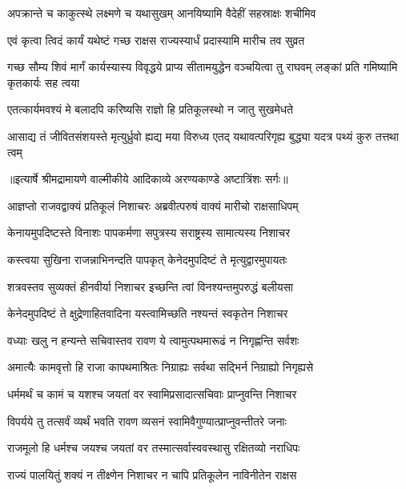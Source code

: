\twolineshloka
{अपक्रान्ते च काकुत्स्थे लक्ष्मणे च यथासुखम्}
{आनयिष्यामि वैदेहीं सहस्राक्षः शचीमिव} %

\twolineshloka
{एवं कृत्वा त्विदं कार्यं यथेष्टं गच्छ राक्षस}
{राज्यस्यार्धं प्रदास्यामि मारीच तव सुव्रत} %

\threelineshloka
{गच्छ सौम्य शिवं मार्गं कार्यस्यास्य विवृद्धये}
{प्राप्य सीतामयुद्धेन वञ्चयित्वा तु राघवम्}
{लङ्कां प्रति गमिष्यामि कृतकार्यः सह त्वया} %

\twolineshloka
{एतत्कार्यमवश्यं मे बलादपि करिष्यसि}
{राज्ञो हि प्रतिकूलस्थो न जातु सुखमेधते} %

\fourlineindentedshloka
{आसाद्य तं जीवितसंशयस्ते}
{मृत्युर्ध्रुवो ह्यद्य मया विरुध्य}
{एतद् यथावत्परिगृह्य बुद्ध्या}
{यदत्र पथ्यं कुरु तत्तथा त्वम्} %


{॥इत्यार्षे श्रीमद्रामायणे वाल्मीकीये आदिकाव्ये अरण्यकाण्डे अष्टात्रिंशः सर्गः॥}


\twolineshloka
{आज्ञप्तो राजवद्वाक्यं प्रतिकूलं निशाचरः}
{अब्रवीत्परुषं वाक्यं मारीचो राक्षसाधिपम्} %

\twolineshloka
{केनायमुपदिष्टस्ते विनाशः पापकर्मणा}
{सपुत्रस्य सराष्ट्रस्य सामात्यस्य निशाचर} %

\twolineshloka
{कस्त्वया सुखिना राजन्नाभिनन्दति पापकृत्}
{केनेदमुपदिष्टं ते मृत्युद्वारमुपायतः} %

\twolineshloka
{शत्रवस्तव सुव्यक्तं हीनवीर्या निशाचर}
{इच्छन्ति त्वां विनश्यन्तमुपरुद्धं बलीयसा} %

\twolineshloka
{केनेदमुपदिष्टं ते क्षुद्रेणाहितवादिना}
{यस्त्वामिच्छति नश्यन्तं स्वकृतेन निशाचर} %

\twolineshloka
{वध्याः खलु न हन्यन्ते सचिवास्तव रावण}
{ये त्वामुत्पथमारूढं न निगृह्णन्ति सर्वशः} %

\twolineshloka
{अमात्यैः कामवृत्तो हि राजा कापथमाश्रितः}
{निग्राह्यः सर्वथा सद्भिर्न निग्राह्यो निगृह्यसे} %

\twolineshloka
{धर्ममर्थं च कामं च यशश्च जयतां वर}
{स्वामिप्रसादात्सचिवाः प्राप्नुवन्ति निशाचर} %

\twolineshloka
{विपर्यये तु तत्सर्वं व्यर्थं भवति रावण}
{व्यसनं स्वामिवैगुण्यात्प्राप्नुवन्तीतरे जनाः} %

\twolineshloka
{राजमूलो हि धर्मश्च जयश्च जयतां वर}
{तस्मात्सर्वास्ववस्थासु रक्षितव्यो नराधिपः} %

\twolineshloka
{राज्यं पालयितुं शक्यं न तीक्ष्णेन निशाचर}
{न चापि प्रतिकूलेन नाविनीतेन राक्षस} %

